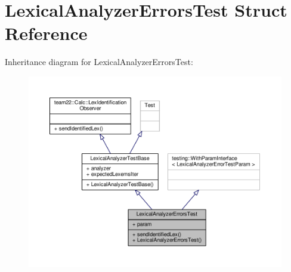 \hypertarget{struct_lexical_analyzer_errors_test}{}\section{Lexical\+Analyzer\+Errors\+Test Struct Reference}
\label{struct_lexical_analyzer_errors_test}


Inheritance diagram for Lexical\+Analyzer\+Errors\+Test\+:
\nopagebreak
\begin{figure}[H]
\begin{center}
\leavevmode
\includegraphics[width=350pt]{struct_lexical_analyzer_errors_test__inherit__graph}
\end{center}
\end{figure}


